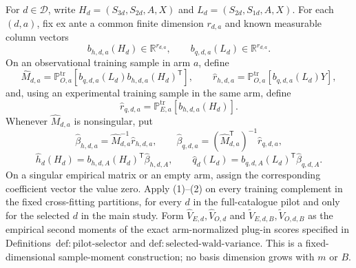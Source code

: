 For \(d\in\mathcal D\), write \(H_d=(S_{3d},S_{2d},A,X)\) and \(L_d=(S_{2d},S_{1d},A,X)\).  For each \((d,a)\), fix ex ante a common finite dimension \(r_{d,a}\) and known measurable column vectors
\[
 b_{h,d,a}(H_d)\in\mathbb R^{r_{d,a}},
 \qquad b_{q,d,a}(L_d)\in\mathbb R^{r_{d,a}}.
\]
On an observational training sample in arm \(a\), define
\[
 \widehat M_{d,a}
 =\mathbb P_{O,a}^{\mathrm{tr}}
   [b_{q,d,a}(L_d)b_{h,d,a}(H_d)^{\mathsf T}],
 \qquad
 \widehat r_{h,d,a}
 =\mathbb P_{O,a}^{\mathrm{tr}}[b_{q,d,a}(L_d)Y],
\]
and, using an experimental training sample in the same arm, define
\[
 \widehat r_{q,d,a}
 =\mathbb P_{E,a}^{\mathrm{tr}}[b_{h,d,a}(H_d)].
\]
Whenever \(\widehat M_{d,a}\) is nonsingular, put
\[
 \widehat\beta_{h,d,a}=\widehat M_{d,a}^{-1}\widehat r_{h,d,a},
 \qquad
 \widehat\beta_{q,d,a}=(\widehat M_{d,a}^{\mathsf T})^{-1}
                         \widehat r_{q,d,a},                   \tag{1}
\]
\[
 \widehat h_d(H_d)=b_{h,d,A}(H_d)^{\mathsf T}
                    \widehat\beta_{h,d,A},
 \qquad
 \widehat q_d(L_d)=b_{q,d,A}(L_d)^{\mathsf T}
                    \widehat\beta_{q,d,A}.                   \tag{2}
\]
On a singular empirical matrix or an empty arm, assign the corresponding coefficient vector the value zero.  Apply (1)--(2) on every training complement in the fixed cross-fitting partitions, for every \(d\) in the full-catalogue pilot and only for the selected \(d\) in the main study.  Form \(\widehat V_{E,d},\widehat V_{O,d}\) and \(\widetilde V_{E,d,B},\widetilde V_{O,d,B}\) as the empirical second moments of the exact arm-normalized plug-in scores specified in Definitions~\(\mathrm{def{:}pilot\text{-}selector}\) and \(\mathrm{def{:}selected\text{-}wald\text{-}variance}\).  This is a fixed-dimensional sample-moment construction; no basis dimension grows with \(m\) or \(B\).